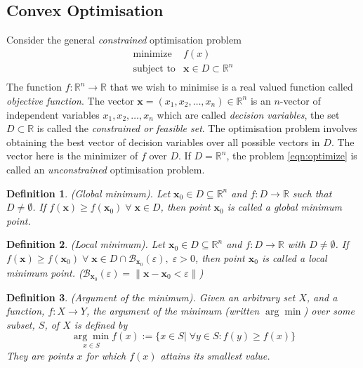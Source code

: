 \documentclass[12pt]{report}
\newtheorem{defn}{Definition}[section]
\numberwithin{equation}{section}
\begin{document}
\subsection{Convex Optimisation}
Consider the general \textit{constrained} optimisation problem 
\begin{equation}\label{eqn:optimize}
\begin{array}{ll}
\text{minimize} & f(x)  \\
\text{subject to} & \bm{x} \in D \subset \mathbb{R}^n \\
\end{array}
\end{equation}
The function $f:\mathbb{R}^n \rightarrow \mathbb{R}$ that we wish to minimise is a real valued function called \textit{objective function}. The vector $\bm{x}=(x_1,x_2,\hdots,x_n)\in \mathbb{R}^n$ is an $n$-vector of independent variables $x_1,x_2,\hdots,x_n$ which are called \textit{decision variables}, the set $D \subset \mathbb{R}$ is called the \textit{constrained or feasible set}. The optimisation problem involves obtaining the best vector of decision variables over all possible vectors in $D$. The vector here is the minimizer of $f$ over $D$. If $D=\mathbb{R}^n$, the problem \eqref{eqn:optimize} is called an \textit{unconstrained} optimisation problem.
\begin{defn} 
\normalfont
(Global minimum).
Let $\bm{x}_0 \in D \subseteq \mathbb{R}^n$ and $f:D \rightarrow \mathbb{R}$ such that $D \neq \emptyset$. If $f(\bm{x}) \geq f(\bm{x}_0) \;  \forall \; \bm{x} \in D$, then point $\bm{x}_0$ is called a global minimum point.
\end{defn}
\begin{defn} 
\normalfont
(Local minimum).
Let $\bm{x}_0 \in D \subseteq \mathbb{R}^n$ and $f:D \rightarrow \mathbb{R}$ with $D \neq \emptyset$. If $f(\bm{x}) \geq f(\bm{x}_0) \;  \forall \; \bm{x} \in D \cap \mathcal{B}_{\bm{x}_0}(\varepsilon),\; \varepsilon>0$, then point $\bm{x}_0$ is called a local minimum point. ($\mathcal{B}_{\bm{x}_0}(\varepsilon) = \| \bm{x}-\bm{x}_0<\varepsilon\|$)
\end{defn}
\begin{defn} 
\normalfont
(Argument of the minimum).
Given an arbitrary set $X$,  and a function, $f\colon X\rightarrow Y$, the argument of the minimum (written $\arg\min$) over some subset, $S$, of $X$ is defined by
\[ \underset{x \in S}{\arg \min } f(x):=\{x \in S | \; \forall y \in S: f(y) \geq f(x)\}
\]
They are points $x$ for which $f(x)$ attains its smallest value. 
\end{defn}
\end{document}
